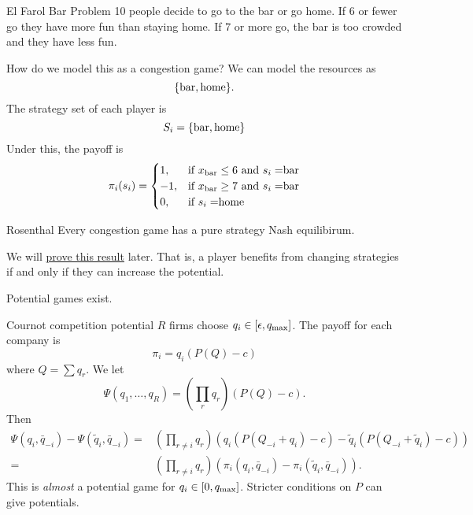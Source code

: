 \begin{aexample}{El Farol Bar Problem}{}
    10 people decide to go to the bar or go home. 
    If 6 or fewer go they have more fun than staying home. If 7 or more go, the bar is too crowded and they have less fun.
\end{aexample}
How do we model this as a congestion game?
We can model the resources as \[
\{\rm{bar}, \rm{home}\}.
\]
The strategy set of each player is \[
S_i=\{\rm{bar},\rm{home}\}
\]
Under this, the payoff is\[
\pi_i(s_i)=\begin{cases}
    1,&\textrm{if $x_{\rm{bar}}\leq 6$ and $s_i=$bar}\\-1,&\textrm{if $x_{\rm{bar}}\geq 7$ and $s_i=$bar}\\
    0,&\textrm{if $s_i=$home}\\
\end{cases}
\]
\begin{atheorem}{Rosenthal}{}
    Every congestion game has a pure strategy Nash equilibirum.
\end{atheorem}
We will \hyperref[]{prove this result} later.
That is, a player benefits from changing strategies if and only if they can increase the potential.

Potential games exist.
\begin{aexample}{Cournot competition potential}{}
    $R$ firms choose $q_i\in[\epsilon,q_{\rm{max}}]$. The payoff for each company is \[
    \pi_i = q_i(P(Q)-c)
    \]
    where $Q=\sum q_r$.
    We let \[
        \Psi(q_1,\ldots, q_R) = \left(\prod_r q_r \right)(P(Q)-c).
    \]
    Then \begin{align*}
        \Psi(q_i,\bar{q}_{-i})-\Psi(\tilde{q}_i,\bar{q}_{-i})=&\left(\prod_{r\neq i}q_r\right)(q_i(P(Q_{-i}+q_i)-c)-\tilde{q}_i(P(Q_{-i}+\tilde{q}_i)-c))\\
        =&\left(\prod_{r\neq i}q_r\right)(\pi_i(q_i,\bar{q}_{-i})-\pi_i(\tilde{q}_i,\bar{q}_{-i})).
    \end{align*}
    This is \textit{almost} a potential game for $q_i\in[0,q_{\rm{max}}]$. Stricter conditions on $P$ can give potentials. 
\end{aexample} 


